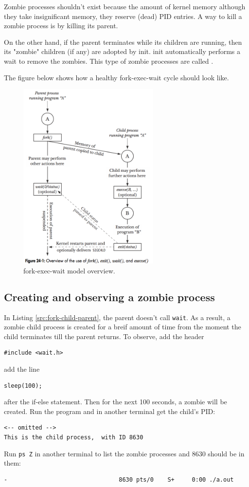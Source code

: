\documentclass[a4paper]{article}
\begin{document}
Zombie processes shouldn't exist because the amount of kernel memory although they take insignificant memory, they reserve (dead) PID entries. A way to kill a zombie process is by killing its parent. 

On the other hand, if the parent terminates while its children are running, then its "zombie" children (if any) are adopted by init. init automatically performs a wait to remove the zombies. This type of zombie processes are called .

The figure below shows how a healthy fork-exec-wait cycle should look like.
\begin{figure}[H]
    \centering
    \includegraphics[height=9.5cm]{img/fork-exec-wait cycle.png}
    \caption{fork-exec-wait model overview.}
\end{figure}



\subsection{Creating and observing a zombie process}

In Listing \ref{src:fork-child-parent}, the parent doesn't call \texttt{wait}. As a result, a zombie child process is created for a breif amount of time from the moment the child terminates till the parent returns. To observe, add the header
\begin{verbatim}
#include <wait.h>
\end{verbatim}
add the line
\begin{verbatim}
sleep(100);
\end{verbatim}
after the if-else statement. Then for the next 100 seconds, a zombie will be created. Run the program and in another terminal get the child's PID:
\begin{verbatim}
<-- omitted -->
This is the child process,  with ID 8630
\end{verbatim}
Run \texttt{ps Z} in another terminal to list the zombie processes and 8630 should be in them:
\begin{verbatim}
-                                8630 pts/0    S+     0:00 ./a.out
\end{verbatim}
\end{document}
